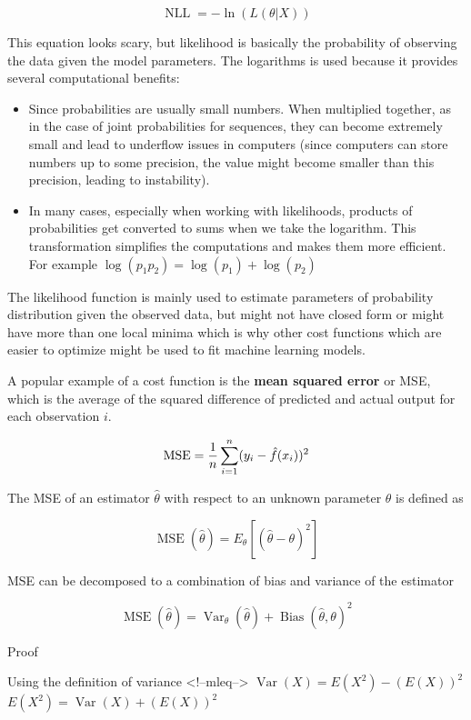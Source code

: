 \[\operatorname{NLL} = - \ln(L(\theta | X))\]

This equation looks scary, but likelihood is basically the probability of observing the data given the model parameters. The logarithms is used because it provides several computational benefits:

\begin{itemize}
    \item Since probabilities are usually small numbers. When multiplied together, as in the case of joint probabilities for sequences, they can become extremely small and lead to underflow issues in computers (since computers can store numbers up to some precision, the value might become smaller than this precision, leading to instability).
    \item In many cases, especially when working with likelihoods, products of probabilities get converted to sums when we take the logarithm. This transformation simplifies the computations and makes them more efficient. For example \(\log(p_1  p_2) = \log(p_1) + \log(p_2)\)
\end{itemize}

The likelihood function is mainly used to estimate parameters of probability distribution given the observed data, but might not have closed form or might have more than one local minima which is why other cost functions which are easier to optimize might be used to fit machine learning models.

A popular example of a cost function is the \textbf{mean squared error} or MSE, which is the average of the squared difference of predicted and actual output for each observation \(i\).

\[\operatorname{MSE} = {1 \over n} \sum_{i=1}^n(y_i - \hat{f}(x_i))^2 \]

The MSE of an estimator \(\hat{\theta}\) with respect to an unknown parameter \(\theta\) is defined as

\[\operatorname{MSE}(\hat\theta)=E_\theta[ ({\hat \theta}-\theta )^{2} ]\]

MSE can be decomposed to a combination of bias and variance of the estimator

\[{\displaystyle \operatorname {MSE} ({\hat \theta})=\operatorname {Var} _\theta({\hat \theta})+\operatorname {Bias} ({\hat \theta},\theta )^{2}}\]

Proof

Using the definition of variance
<!--mleq-->
\(\operatorname{Var}(X) = E(X^{2}) - (E(X))^{2}\) \\
\(E(X^{2})=\operatorname{Var}(X)+(E(X))^{2}\)

